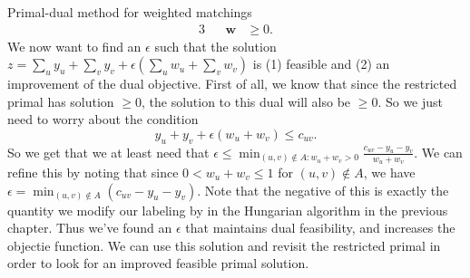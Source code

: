 \documentclass[11pt]{article}
\renewcommand{\'}{^{'}}
\begin{document}
\begin{section}{Primal-dual method for weighted matchings}
\begin{alignat}{3}
				     && \mathbf{w} & \geq 0.
	\end{alignat}
	We now want to find an $\epsilon$ such that the solution $z = \sum_u y_u + \sum_v y_v + 
	\epsilon (\sum_u w_u + \sum_v w_v)$ is (1) feasible and (2) an improvement of the dual 
	objective. First of all, we know that since the restricted primal has solution $\geq 0$, 
	the solution to this dual will also be $\geq 0$. So we just need to worry about the condition 
	\[
		y_u + y_v + \epsilon (w_u + w_v) \leq c_{uv}.
	\]
	So we get that we at least need that $\epsilon \leq \min_{(u,v)\notin A: w_u + w_v > 0}
	\frac{c_{uv} - y_u - y_v}{w_u + w_v}$. We can refine this by noting that since 
	$0 < w_u + w_v \leq 1$ for $(u,v)\notin A$, we have $\epsilon = \min_{(u,v)\notin A} 
	(c_{uv} - y_u - y_v)$. Note that the negative of this is exactly the quantity we modify our 
	labeling by in the Hungarian algorithm in the previous chapter. Thus we've found an 
	$\epsilon$ that maintains dual feasibility, and increases the objectie function. We can use 
	this solution and revisit the restricted primal in order to look for an improved feasible 
	primal solution.
\end{section}
\end{document}
